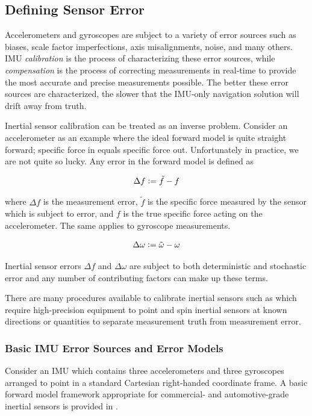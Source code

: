 \subsection{Defining Sensor Error}

Accelerometers and gyroscopes are subject to a variety of error sources such as biases, scale factor imperfections, axis misalignments, noise, and many others. IMU \textit{calibration} is the process of characterizing these error sources, while \textit{compensation} is the process of correcting measurements in real-time to provide the most accurate and precise measurements possible. The better these error sources are characterized, the slower that the IMU-only navigation solution will drift away from truth. 

Inertial sensor calibration can be treated as an inverse problem. Consider an accelerometer as an example where the ideal forward model is quite straight forward; specific force in equals specific force out. Unfortunately in practice, we are not quite so lucky. Any error in the forward model is defined as

\begin{align*}
	\Delta f \vcentcolon= \tilde{f} - f
\end{align*}

where $\Delta f$ is the measurement error, $\tilde{f}$ is the specific force measured by the sensor which is subject to error, and $f$ is the true specific force acting on the accelerometer. The same applies to gyroscope measurements. 

\begin{align*}
	\Delta \omega \vcentcolon= \tilde{\omega} - \omega
\end{align*}

Inertial sensor errors $\Delta f$ and $\Delta \omega$ are subject to both deterministic and stochastic error and any number of contributing factors can make up these terms.

There are many procedures available to calibrate inertial sensors such as \cite{ImprovedIMUCalibrationProcedures} which require high-precision equipment to point and spin inertial sensors at known directions or quantities to separate measurement truth from measurement error.


\subsubsection{Basic IMU Error Sources and Error Models}

Consider an IMU which contains three accelerometers and three gyroscopes arranged to point in a standard Cartesian right-handed coordinate frame. A basic forward model framework appropriate for commercial- and automotive-grade inertial sensors is provided in \cite{groves2013principles}. 

